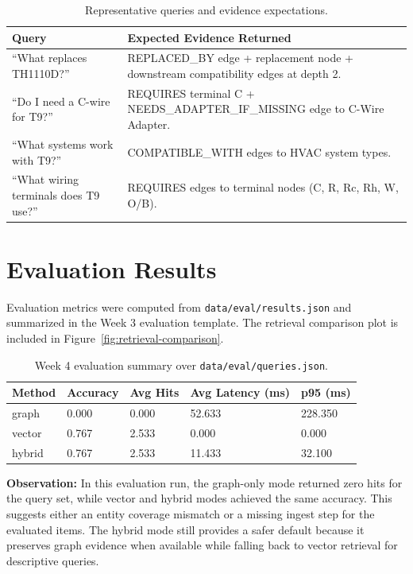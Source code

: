 \documentclass[11pt,a4paper]{article}
\begin{document}
\begin{table}[H]
\centering
\small
\setlength{\tabcolsep}{6pt}
\begin{tabularx}{\textwidth}{L{0.30\textwidth}Y}
\toprule
{}
\textbf{Query} & \textbf{Expected Evidence Returned} \\
\midrule
``What replaces TH1110D?'' & REPLACED\_BY edge + replacement node + downstream compatibility edges at depth 2. \\
``Do I need a C-wire for T9?'' & REQUIRES terminal C + NEEDS\_ADAPTER\_IF\_MISSING edge to C-Wire Adapter. \\
``What systems work with T9?'' & COMPATIBLE\_WITH edges to HVAC system types. \\
``What wiring terminals does T9 use?'' & REQUIRES edges to terminal nodes (C, R, Rc, Rh, W, O/B). \\
\bottomrule
\end{tabularx}
\caption{Representative queries and evidence expectations.}
\label{tab:query-examples}
\end{table}

\section{Evaluation Results}
Evaluation metrics were computed from \texttt{data/eval/results.json} and summarized in the Week 3 evaluation template. The retrieval comparison plot is included in Figure~\ref{fig:retrieval-comparison}.

\begin{table}[H]
\centering
\small
\setlength{\tabcolsep}{6pt}
\begin{tabularx}{\textwidth}{L{0.20\textwidth}L{0.15\textwidth}L{0.15\textwidth}L{0.20\textwidth}L{0.15\textwidth}}
\toprule
{}
\textbf{Method} & \textbf{Accuracy} & \textbf{Avg Hits} & \textbf{Avg Latency (ms)} & \textbf{p95 (ms)} \\
\midrule
graph & 0.000 & 0.000 & 52.633 & 228.350 \\
vector & 0.767 & 2.533 & 0.000 & 0.000 \\
hybrid & 0.767 & 2.533 & 11.433 & 32.100 \\
\bottomrule
\end{tabularx}
\caption{Week 4 evaluation summary over \texttt{data/eval/queries.json}.}
\label{tab:week4-eval}
\end{table}

\textbf{Observation:} In this evaluation run, the graph-only mode returned zero hits for the query set, while vector and hybrid modes achieved the same accuracy. This suggests either an entity coverage mismatch or a missing ingest step for the evaluated items. The hybrid mode still provides a safer default because it preserves graph evidence when available while falling back to vector retrieval for descriptive queries.
\end{document}
